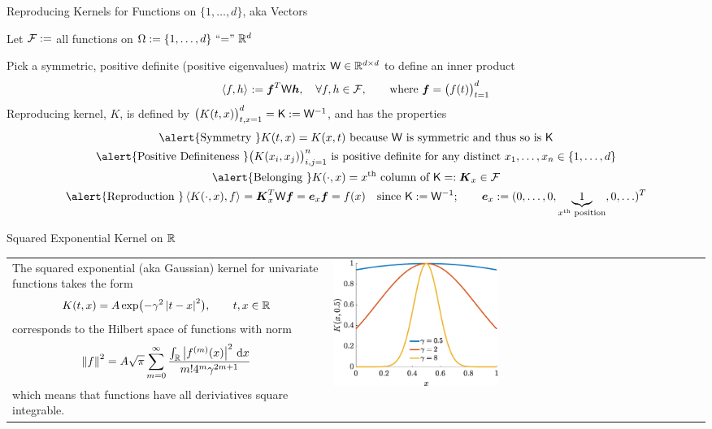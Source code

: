 \documentclass[10pt,compress,xcolor={usenames,dvipsnames},aspectratio=169]{beamer}
\begin{document}
\begin{frame}[label = RKRd]{Reproducing Kernels for Functions on $\{1, \ldots, d\}$, aka Vectors}
	
	\vspace{-3ex}
	Let $\mathcal{F}:=$ all functions on $\Omega := \{1, \ldots, d\} \text{ ``$=$'' } \mathbb{R}^d$
	
	Pick a symmetric, positive definite (positive eigenvalues) matrix $\mathsf{W} \in \mathbb{R}^{d \times d}$ to define an inner product \vspace{-0.3ex}
	\[
	\left \langle f, h \right \rangle_{{}} : = \boldsymbol{f}^T \mathsf{W} \boldsymbol{h}, \quad \forall f, h \in \mathcal{F}, \qquad \text{where } \boldsymbol{f} = \bigl(f(t) \bigr)_{t=1}^d
	\]
	\alert{Reproducing kernel}, $K$, is defined by 
			$\bigl ( K(t,x) \bigr)_{t,x=1}^d = \mathsf{K} := \mathsf{W}^{-1}$, and has the properties
		\vspace{-0.5ex}
		\begin{gather*}
			\alert{\text{Symmetry }} K(t,x) = K(x,t) \text{ because $\mW$ is symmetric and thus so is $\mK$} \\
			\alert{\text{Positive Definiteness }} \bigl(  K(x_i,x_j)\bigr)_{i,j = 1}^n \text{ is positive definite for any distinct } x_1, \ldots, x_n \in \{1, \ldots, d\}\\
			\alert{\text{Belonging }} K(\cdot,x) = \text{$x^{\text{th}}$ column of $\mK$} =: \vK_x \in \cf\\
			\alert{\text{Reproduction }} \ip{K(\cdot,x)}{f} = \vK_x^T \mW \vf = \ve_x \vf = f(x) \quad \text{since } \mK := \mW^{-1};  \qquad 
				\ve_x := (0, \ldots, 0, \underbrace{1}_{x^{\text{th}} \text{ position}}, 0, \ldots )^T
		\end{gather*}
	
	
\end{frame}
\begin{frame}{Squared Exponential Kernel on $\mathbb{R}$}
	
	\begin{tabular}{m{}m{}}
		The squared exponential (aka Gaussian) kernel for univariate functions takes the form 
		\[
		K(t,x) = A \exp\bigl(-\gamma^2\left \lvert t-x \right \rvert^2 \bigr) , \qquad t, x \in \mathbb{R}
		\]
		corresponds to the Hilbert space of functions with norm \cite[(6.18)]{RasWil06a}
		\begin{equation*}
			\left \lVert f \right \rVert_{{}}^2 = A\sqrt{\pi} \sum_{m=0}^\infty\frac{\int_{\mathbb{R}} \left \lvert f^{(m)}(x) \right \rvert^2 \, {\rm d} x}{m! 4^m \gamma^{2m+1}}
		\end{equation*}
		which means that functions  have all deriviatives square integrable.
		&
		\includegraphics[width=0.45\textwidth]{RK-sqexpker.eps}
	\end{tabular}
\end{frame}
\end{document}
